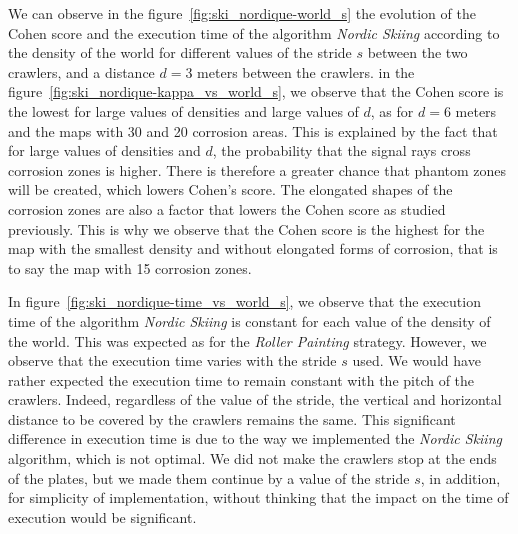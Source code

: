 We can observe in the figure~\ref{fig:ski_nordique-world_s} the evolution of the Cohen score and the execution time of the algorithm \textit{Nordic Skiing} according to the density of the world for different values of the stride $s$ between the two crawlers, and a distance $d = 3$ meters between the crawlers.
in the figure~\ref{fig:ski_nordique-kappa_vs_world_s}, we observe that the Cohen score is the lowest for large values of densities and large values of $d$, as for $d = 6$ meters and the maps with 30 and 20 corrosion areas.
This is explained by the fact that for large values of densities and $d$, the probability that the signal rays cross corrosion zones is higher.
There is therefore a greater chance that phantom zones will be created, which lowers Cohen's score.
The elongated shapes of the corrosion zones are also a factor that lowers the Cohen score as studied previously.
This is why we observe that the Cohen score is the highest for the map with the smallest density and without elongated forms of corrosion, that is to say the map with 15 corrosion zones.

In figure~\ref{fig:ski_nordique-time_vs_world_s}, we observe that the execution time of the algorithm \textit{Nordic Skiing} is constant for each value of the density of the world.
This was expected as for the \textit{Roller Painting} strategy.
However, we observe that the execution time varies with the stride $s$ used.
We would have rather expected the execution time to remain constant with the pitch of the crawlers.
Indeed, regardless of the value of the stride, the vertical and horizontal distance to be covered by the crawlers remains the same.
This significant difference in execution time is due to the way we implemented the \textit{Nordic Skiing} algorithm, which is not optimal.
We did not make the crawlers stop at the ends of the plates, but we made them continue by a value of the stride $s$, in addition, for simplicity of implementation, without thinking that the impact on the time of execution would be significant.

